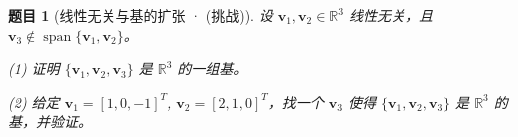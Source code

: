 \documentclass[12pt]{ctexart}
\newtheorem{problem}{题目}
\begin{document}






\begin{problem}[线性无关与基的扩张 · (挑战)]
设 $\mathbf{v}_1, \mathbf{v}_2 \in \mathbb{R}^3$ 线性无关，且 $\mathbf{v}_3 \notin \operatorname{span}\{\mathbf{v}_1, \mathbf{v}_2\}$。

(1) 证明 $\{\mathbf{v}_1, \mathbf{v}_2, \mathbf{v}_3\}$ 是 $\mathbb{R}^3$ 的一组基。

(2) 给定 $\mathbf{v}_1 = [1, 0, -1]^T$, $\mathbf{v}_2 = [2, 1, 0]^T$，找一个 $\mathbf{v}_3$ 使得 $\{\mathbf{v}_1, \mathbf{v}_2, \mathbf{v}_3\}$ 是 $\mathbb{R}^3$ 的基，并验证。
\end{problem}




\end{document}
